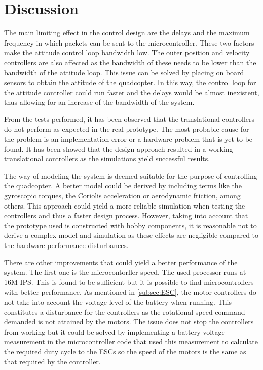 \chapter{Discussion}
The main limiting effect in the control design are the delays and the maximum frequency in which packets can be sent to the microcontroller. These two factors make the attitude control loop bandwidth low. The outer position and velocity controllers are also affected as the bandwidth of these needs to be lower than the bandwidth of the attitude loop. This issue can be solved by placing on board sensors to obtain the attitude of the quadcopter. In this way, the control loop for the attitude controller could run faster and the delays would be almost inexistent, thus allowing for an increase of the bandwidth of the system.

From the tests performed, it has been observed that the translational controllers do not perform as expected in the real prototype. The most probable cause for the problem is an implementation error or a hardware problem that is yet to be found. It has been showed that the design approach resulted in a working translational controllers as the simulations yield successful results. 

The way of modeling the system is deemed suitable for the purpose of controlling the quadcopter. A better model could be derived by including terms like the gyroscopic torques, the Coriolis acceleration or aerodynamic friction, among others. This approach could yield a more reliable simulation when testing the controllers and thus a faster design process. However, taking into account that the prototype used is constructed with hobby components, it is reasonable not to derive a complex model and simulation as these effects are negligible compared to the hardware performance disturbances. 

There are other improvements that could yield a better performance of the system. The first one is the microcontorller speed. The used processor runs at 16M IPS. This is found to be sufficient but it is possible to find microcontrollers with better performance. As mentioned in \autoref{subsec:ESC}, the motor controllers do not take into account the voltage level of the battery when running. This constitutes a disturbance for the controllers as the rotational speed command demanded is not attained by the motors. The issue does not stop the controllers from working but it could be solved by implementing a battery voltage measurement in the microcontroller code that used this measurement to calculate the required duty cycle to the ESCs so the speed of the motors is the same as that required by the controller.


